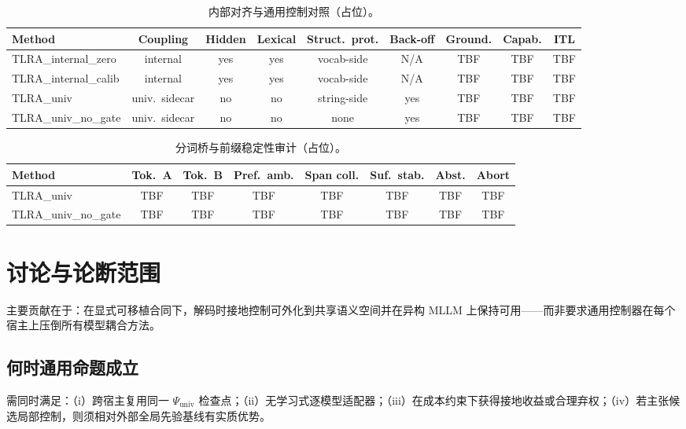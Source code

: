 \begin{table}[t]
  \caption{内部对齐与通用控制对照（占位）。}
  \label{tab:internal}
  \centering
  \footnotesize
  \begin{tabular}{@{}lcccccccc@{}}
    \toprule
    Method & Coupling & Hidden & Lexical & Struct.~prot. & Back-off & Ground. & Capab. & ITL \\
    \midrule
    TLRA\_internal\_zero & internal & yes & yes & vocab-side & N/A & TBF & TBF & TBF \\
    TLRA\_internal\_calib & internal & yes & yes & vocab-side & N/A & TBF & TBF & TBF \\
    TLRA\_univ & univ.\ sidecar & no & no & string-side & yes & TBF & TBF & TBF \\
    TLRA\_univ\_no\_gate & univ.\ sidecar & no & no & none & yes & TBF & TBF & TBF \\
    \bottomrule
  \end{tabular}
\end{table}

\begin{table}[t]
  \caption{分词桥与前缀稳定性审计（占位）。}
  \label{tab:bridge}
  \centering
  \scriptsize
  \begin{tabular}{@{}lccccccc@{}}
    \toprule
    Method & Tok.\ A & Tok.\ B & Pref.\ amb. & Span coll. & Suf.\ stab. & Abst. & Abort \\
    \midrule
    TLRA\_univ & TBF & TBF & TBF & TBF & TBF & TBF & TBF \\
    TLRA\_univ\_no\_gate & TBF & TBF & TBF & TBF & TBF & TBF & TBF \\
    \bottomrule
  \end{tabular}
\end{table}

\section{讨论与论断范围}
\label{sec:discussion}

主要贡献在于：在显式可移植合同下，解码时接地控制可外化到共享语义空间并在异构 MLLM 上保持可用——而非要求通用控制器在每个宿主上压倒所有模型耦合方法。

\subsection{何时通用命题成立}

需同时满足：（i）跨宿主复用同一 $\Psi_{\mathrm{univ}}$ 检查点；（ii）无学习式逐模型适配器；（iii）在成本约束下获得接地收益或合理弃权；（iv）若主张候选局部控制，则须相对外部全局先验基线有实质优势。

